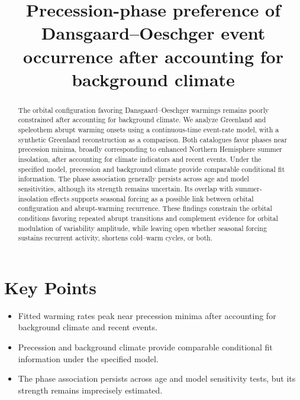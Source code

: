 \documentclass[11pt]{article}
\title{Precession-phase preference of Dansgaard--Oeschger event occurrence after accounting for background climate}
\author{}
\date{}
\begin{document}
\maketitle
\linenumbers

\section*{Key Points}
\begin{itemize}
\item Fitted warming rates peak near precession minima after accounting for background climate and recent events.
\item Precession and background climate provide comparable conditional fit information under the specified model.
\item The phase association persists across age and model sensitivity tests, but its strength remains imprecisely estimated.
\end{itemize}

\begin{abstract}
The orbital configuration favoring Dansgaard--Oeschger warmings remains poorly constrained after accounting for background climate. We analyze Greenland and speleothem abrupt warming onsets using a continuous-time event-rate model, with a synthetic Greenland reconstruction as a comparison. Both catalogues favor phases near precession minima, broadly corresponding to enhanced Northern Hemisphere summer insolation, after accounting for climate indicators and recent events. Under the specified model, precession and background climate provide comparable conditional fit information. The phase association generally persists across age and model sensitivities, although its strength remains uncertain. Its overlap with summer-insolation effects supports seasonal forcing as a possible link between orbital configuration and abrupt-warming recurrence. These findings constrain the orbital conditions favoring repeated abrupt transitions and complement evidence for orbital modulation of variability amplitude, while leaving open whether seasonal forcing sustains recurrent activity, shortens cold--warm cycles, or both.
\end{abstract}
\end{document}
